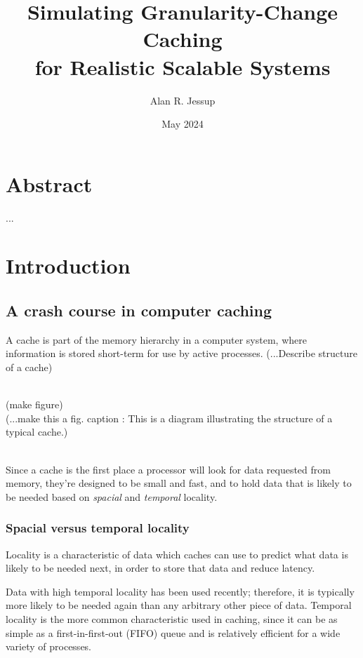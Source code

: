 \documentclass[12pt,twoside]{reedthesis}
\title{Simulating Granularity-Change Caching \\ for Realistic Scalable Systems}
\author{Alan R. Jessup}
\date{May 2024}
\begin{document}
\maketitle
\frontmatter %
\pagestyle{empty}

\tableofcontents

\chapter*{Abstract}

...

\mainmatter
\pagestyle{fancyplain}

\chapter*{Introduction}
	\setcounter{chapter}{0}
	\setcounter{section}{0}

\section{A crash course in computer caching}
A cache is part of the memory hierarchy in a computer system, where information is stored short-term for use by active processes. (...Describe structure of a cache)

\;\\ (make figure) \\

(...make this a fig. caption : This is a diagram illustrating the structure of a typical cache.)

\;\\

Since a cache is the first place a processor will look for data requested from memory, they're designed to be small and fast, and to hold data that is likely to be needed based on \textit{spacial} and \textit{temporal} locality.

	\subsection*{Spacial versus temporal locality}
	Locality is a characteristic of data which caches can use to predict what data is likely to be needed next, in order to store that data and reduce latency.
	
	Data with high temporal locality has been used recently; therefore, it is typically more likely to be needed again than any arbitrary other piece of data. Temporal locality is the more common characteristic used in caching, since it can be as simple as a first-in-first-out (FIFO) queue and is relatively efficient for a wide variety of processes.
	
\end{document}
